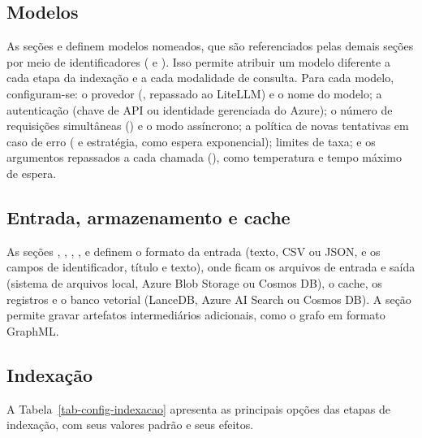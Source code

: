 \subsection{Modelos}
\label{sec-graphrag-config-modelos}

As seções  e  definem modelos nomeados, que são referenciados pelas demais seções por meio de identificadores ( e ). Isso permite atribuir um modelo diferente a cada etapa da indexação e a cada modalidade de consulta. Para cada modelo, configuram-se: o provedor (, repassado ao LiteLLM) e o nome do modelo; a autenticação (chave de API ou identidade gerenciada do Azure); o número de requisições simultâneas () e o modo assíncrono; a política de novas tentativas em caso de erro ( e estratégia, como espera exponencial); limites de taxa; e os argumentos repassados a cada chamada (), como temperatura e tempo máximo de espera.

\subsection{Entrada, armazenamento e cache}
\label{sec-graphrag-config-armazenamento}

As seções , , , ,  e  definem o formato da entrada (texto, CSV ou JSON, e os campos de identificador, título e texto), onde ficam os arquivos de entrada e saída (sistema de arquivos local, Azure Blob Storage ou Cosmos DB), o cache, os registros e o banco vetorial (LanceDB, Azure AI Search ou Cosmos DB). A seção  permite gravar artefatos intermediários adicionais, como o grafo em formato GraphML.

\subsection{Indexação}
\label{sec-graphrag-config-indexacao}

A Tabela~\ref{tab-config-indexacao} apresenta as principais opções das etapas de indexação, com seus valores padrão e seus efeitos.

